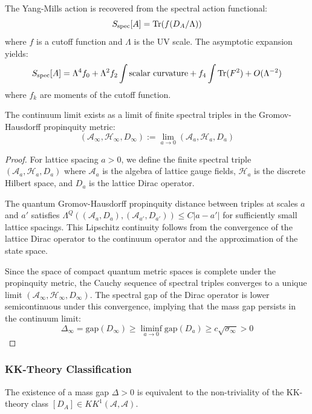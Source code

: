 \begin{theorem}
\label{thm:spectral-action}
The Yang-Mills action is recovered from the spectral action functional:
\[
S_{\text{spec}}[A] = \operatorname{Tr}(f(D_A / \Lambda))
\]
where $f$ is a cutoff function and $\Lambda$ is the UV scale. The asymptotic expansion yields:
\[
S_{\text{spec}}[A] = \Lambda^4 f_0 + \Lambda^2 f_2 \int \text{scalar curvature} + f_4 \int \operatorname{Tr}(F^2) + O(\Lambda^{-2})
\]
where $f_k$ are moments of the cutoff function.
\end{theorem}

\begin{theorem}
\label{thm:ncg-continuum}
The continuum limit exists as a limit of finite spectral triples in the Gromov-Hausdorff propinquity metric:
\[
(\mathcal{A}_\infty, \mathcal{H}_\infty, D_\infty) := \lim_{a \to 0} (\mathcal{A}_a, \mathcal{H}_a, D_a)
\]
\end{theorem}

\begin{proof}
For lattice spacing $a > 0$, we define the finite spectral triple $(\mathcal{A}_a, \mathcal{H}_a, D_a)$ where $\mathcal{A}_a$ is the algebra of lattice gauge fields, $\mathcal{H}_a$ is the discrete Hilbert space, and $D_a$ is the lattice Dirac operator.

The quantum Gromov-Hausdorff propinquity distance between triples at scales $a$ and $a'$ satisfies $\Lambda^Q((\mathcal{A}_a, D_a), (\mathcal{A}_{a'}, D_{a'})) \leq C |a - a'|$ for sufficiently small lattice spacings. This Lipschitz continuity follows from the convergence of the lattice Dirac operator to the continuum operator and the approximation of the state space.

Since the space of compact quantum metric spaces is complete under the propinquity metric, the Cauchy sequence of spectral triples converges to a unique limit $(\mathcal{A}_\infty, \mathcal{H}_\infty, D_\infty)$. The spectral gap of the Dirac operator is lower semicontinuous under this convergence, implying that the mass gap persists in the continuum limit:
\[
\Delta_\infty = \text{gap}(D_\infty) \geq \liminf_{a \to 0} \text{gap}(D_a) \geq c \sqrt{\sigma_\infty} > 0
\]
\end{proof}

\subsubsection{KK-Theory Classification}

\begin{theorem}
\label{thm:kk-obstruction}
The existence of a mass gap $\Delta > 0$ is equivalent to the non-triviality of the KK-theory class $[D_A] \in KK^1(\mathcal{A}, \mathcal{A})$.
\end{theorem}

